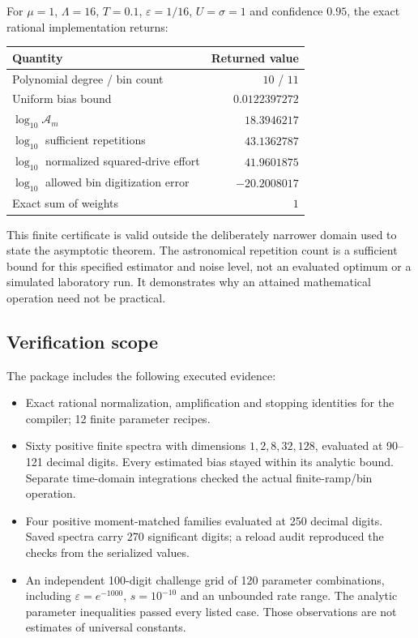 \documentclass[11pt,a4paper]{article}
\begin{document}
For $\mu=1$, $\Lambda=16$, $T=0.1$, $\varepsilon=1/16$, $U=\sigma=1$ and confidence $0.95$, the exact rational implementation returns:
\begin{center}
\begin{tabular}{lr}
\toprule
Quantity&Returned value\\\midrule
Polynomial degree / bin count&$10$ / $11$\\
Uniform bias bound&$0.0122397272$\\
$\log_{10}\mathcal A_m$&$18.3946217$\\
$\log_{10}$ sufficient repetitions&$43.1362787$\\
$\log_{10}$ normalized squared-drive effort&$41.9601875$\\
$\log_{10}$ allowed bin digitization error&$-20.2008017$\\
Exact sum of weights&$1$\\\bottomrule
\end{tabular}
\end{center}
This finite certificate is valid outside the deliberately narrower domain used to state the asymptotic theorem. The astronomical repetition count is a sufficient bound for this specified estimator and noise level, not an evaluated optimum or a simulated laboratory run. It demonstrates why an attained mathematical operation need not be practical.

\subsection{Verification scope}

The package includes the following executed evidence:
\begin{itemize}
\item Exact rational normalization, amplification and stopping identities for the compiler; 12 finite parameter recipes.
\item Sixty positive finite spectra with dimensions $1,2,8,32,128$, evaluated at 90--121 decimal digits. Every estimated bias stayed within its analytic bound. Separate time-domain integrations checked the actual finite-ramp/bin operation.
\item Four positive moment-matched families evaluated at 250 decimal digits. Saved spectra carry 270 significant digits; a reload audit reproduced the checks from the serialized values.
\item An independent 100-digit challenge grid of 120 parameter combinations, including $\varepsilon=e^{-1000}$, $s=10^{-10}$ and an unbounded rate range. The analytic parameter inequalities passed every listed case. Those observations are not estimates of universal constants.
\end{itemize}
\end{document}

